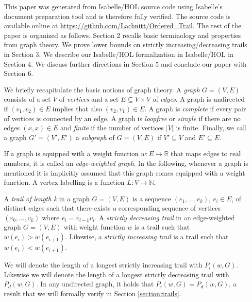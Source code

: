 \begin{isabellebody}
\begin{isamarkuptext}
This paper was generated from Isabelle/HOL source code using Isabelle's document preparation tool 
and is therefore fully verified. The source code is available
online at \url{https://github.com/Lachnitt/Ordered_Trail}. The rest of the paper is organized as follows.
Section 2 recalls basic terminology and properties from graph theory. 
We prove lower bounds on strictly increasing/decreasing trails in Section 3. We describe our Isabelle/HOL 
formalization in Isabelle/HOL in Section 4. We discuss further directions in Section 5 and conclude our paper with Section 6.%
\end{isamarkuptext}\isamarkuptrue%
%
\isadelimdocument
%
\endisadelimdocument
%
\isatagdocument
%
\isamarkuptrue%
%
\endisatagdocument
{\isafolddocument}%
%
\isadelimdocument
%
\endisadelimdocument
%
\begin{isamarkuptext}%
\label{section:Prelim}
We briefly recapitulate the basic notions of graph theory. A {\em graph} $G = (V,E)$ consists of
a set $V$ of {\em vertices} and a set $E \subseteq V \times V$ of {\em edges}. A graph is undirected 
if $(v_1,v_2)\in E$ implies that also $(v_2,v_1)\in E$. A graph is {\em complete}
 if every pair of vertices is connected by an edge. A graph is {\em loopfree} or {\em simple} if there are no edges $(x,x)\in E$ and 
{\em finite} if the number of vertices $|V|$ is finite. Finally, we call 
a graph $G'=(V',E')$ a {\em subgraph} of $G = (V,E) $ if $V' \subseteq V$ and $E' \subseteq E$.

If a graph is equipped with a
 weight function $w: E \mapsto \mathbb{R}$ that maps edges to real numbers, it is called 
 an {\em edge-weighted graph}. In the following, whenever a graph is mentioned it is implicitly assumed
that this graph comes equipped with a weight function. A vertex labelling is a function $L: V \mapsto \mathbb{N}$.

A {\em trail of length k} in a graph $G = (V,E)$ is a sequence $(e_1,\ldots,e_k)$, $e_i \in E$, of distinct edges such that
 there exists a corresponding sequence of vertices $(v_0,...,v_k)$ where $e_i = v_{i-1}v_i$. 
A {\em strictly decreasing trail} in an edge-weighted graph $G = (V,E)$ with weight function $w$
is a trail such that $w (e_i) > w (e_{i+1})$. Likewise, a {\em strictly increasing trail} is a trail such that $w (e_i) < w (e_{i+1})$.

We will denote the length of a longest strictly increasing trail with $P_i(w,G)$. Likewise we will denote the length
of a longest strictly decreasing trail with $P_d(w,G)$. In any undirected graph, it holds that $P_i(w,G) = P_d(w,G)$, 
a result that we will formally verify in Section \ref{section:trails}. 


\end{isamarkuptext}
\end{isabellebody}
